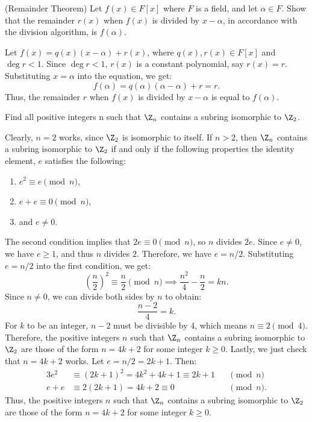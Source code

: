 \begin{problem}[28.36]
  (Remainder Theorem) Let $f(x) \in F[x]$ where $F$ is a field, and let $\alpha \in F$. Show that the remainder $r(x)$ when $f(x)$ is divided by $x - \alpha$, in accordance with the division algorithm, is $f(\alpha)$.
\end{problem}

\begin{solution}
  Let $f(x) = q(x)(x - \alpha) + r(x)$, where $q(x), r(x) \in F[x]$ and $\deg r < 1$. Since $\deg r < 1$, $r(x)$ is a constant polynomial, say $r(x) = r$. Substituting $x = \alpha$ into the equation, we get:
  \[%
    f(\alpha) = q(\alpha)(\alpha - \alpha) + r = r
  .\]%
  Thus, the remainder $r$ when $f(x)$ is divided by $x - \alpha$ is equal to $f(\alpha)$.
\end{solution}

\begin{problem}[30.2]
  Find all positive integers n such that $\Z_n$ contains a subring isomorphic to $\Z_2$.
\end{problem}

\begin{solution}
  Clearly, $n = 2$ works, since $\Z_2$ is isomorphic to itself. If $n > 2$, then $\Z_n$ contains a subring isomorphic to $\Z_2$ if and only if the following properties the identity element, $e$ satisfies the following:
  \begin{enumerate}
    \item $e^2 \equiv e \pmod{n}$,
    \item $e + e \equiv 0 \pmod{n}$,
    \item and $e \ne 0$.
  \end{enumerate}
  The second condition implies that $2e \equiv 0 \pmod{n}$, so $n$ divides $2e$. Since $e \ne 0$, we have $e \ge 1$, and thus $n$ divides $2$. Therefore, we have $e = n/2$. Substituting $e = n/2$ into the first condition, we get:
  \[%
    \left(\frac{n}{2}\right)^2 \equiv \frac{n}{2} \pmod{n} \implies \frac{n^2}{4} - \frac{n}{2} = kn
  .\]%
  Since $n \ne 0$, we can divide both sides by $n$ to obtain:
  \[%
    \frac{n - 2}{4} = k
  .\]%
  For $k$ to be an integer, $n - 2$ must be divisible by 4, which means $n \equiv 2 \pmod{4}$. Therefore, the positive integers $n$ such that $\Z_n$ contains a subring isomorphic to $\Z_2$ are those of the form $n = 4k + 2$ for some integer $k \ge 0$. Lastly, we just check that $n = 4k + 2$ works. Let $e = n/2 = 2k + 1$. Then:
  \begin{alignat*}{3}
    e^2 &\equiv (2k + 1)^2 = 4k^2 + 4k + 1 \equiv 2k + 1 &&\pmod{n} \\
    e + e &\equiv 2(2k + 1) = 4k + 2 \equiv 0 &&\pmod{n}
  .\end{alignat*}
  Thus, the positive integers $n$ such that $\Z_n$ contains a subring isomorphic to $\Z_2$ are those of the form $n = 4k + 2$ for some integer $k \ge 0$.
\end{solution}

